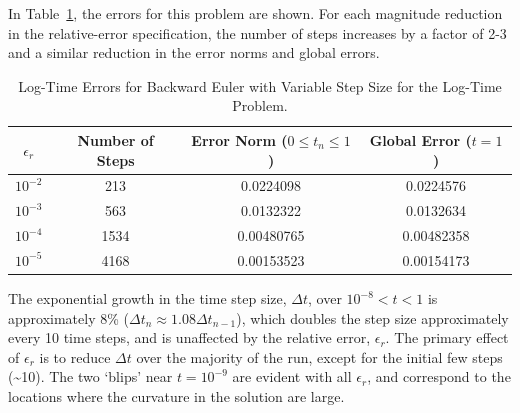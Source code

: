 In Table~\ref{rythmos:tab:BackwardEuler-Variable-dt-Log-Time}, the
errors for this problem are shown. For each magnitude reduction in
the relative-error specification, the number of steps increases by
a factor of 2-3 and a similar reduction in the error norms and global
errors.

\begin{table}


\begin{centering}
\caption{Log-Time Errors for Backward Euler with Variable Step Size for the
Log-Time Problem.\label{rythmos:tab:BackwardEuler-Variable-dt-Log-Time}}
\begin{tabular}{|c|c|c|c|}
\hline 
$\epsilon_{r}$ & Number of Steps & Error Norm ($0\leq t_{n}\leq1$) & Global Error ($t=1$)\tabularnewline
\hline 
\hline 
$10^{-2}$ & 213 & 0.0224098 & 0.0224576\tabularnewline
\hline 
$10^{-3}$ & 563 & 0.0132322 & 0.0132634\tabularnewline
\hline 
$10^{-4}$ & 1534 & 0.00480765 & 0.00482358\tabularnewline
\hline 
$10^{-5}$ & 4168 & 0.00153523 & 0.00154173\tabularnewline
\hline 
\end{tabular}
\par\end{centering}

\end{table}


The exponential growth in the time step size, $\Delta t$, over $10^{-8}<t<1$
is approximately 8\% ($\Delta t_{n}\approx1.08\Delta t_{n-1}$), which
doubles the step size approximately every 10 time steps, and is unaffected
by the relative error, $\epsilon_{r}$. The primary effect of $\epsilon_{r}$
is to reduce $\Delta t$ over the majority of the run, except for
the initial few steps (\textasciitilde{}10). The two `blips' near
$t=10^{-9}$ are evident with all $\epsilon_{r}$, and correspond
to the locations where the curvature in the solution are large.

